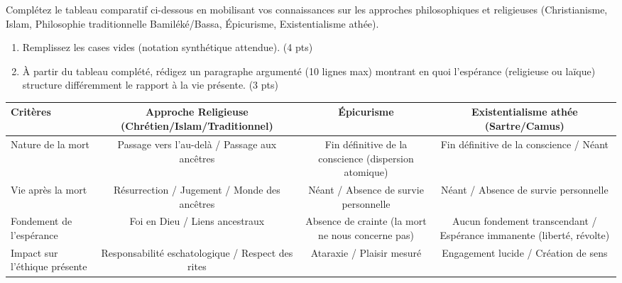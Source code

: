\documentclass[11pt]{article}
\begin{document}
\begin{exercice}
Complétez le tableau comparatif ci-dessous en mobilisant vos connaissances sur les approches philosophiques et religieuses (Christianisme, Islam, Philosophie traditionnelle Bamiléké/Bassa, Épicurisme, Existentialisme athée).
\begin{enumerate}
    \item Remplissez les cases vides (notation synthétique attendue). \hfill (4 pts)
    \item À partir du tableau complété, rédigez un paragraphe argumenté (10 lignes max) montrant en quoi \og l'espérance \fg{} (religieuse ou laïque) structure différemment le rapport à la vie présente. \hfill (3 pts)
\end{enumerate}

\begin{tabularx}{\linewidth}{|X|c|c|c|}
\hline
\textbf{Critères} & \textbf{Approche Religieuse (Chrétien/Islam/Traditionnel)} & \textbf{Épicurisme} & \textbf{Existentialisme athée (Sartre/Camus)} \\
\hline
Nature de la mort & Passage vers l'au-delà / Passage aux ancêtres & Fin définitive de la conscience (dispersion atomique) & Fin définitive de la conscience / Néant \\
\hline
Vie après la mort & Résurrection / Jugement / Monde des ancêtres & Néant / Absence de survie personnelle & Néant / Absence de survie personnelle \\
\hline
Fondement de l'espérance & Foi en Dieu / Liens ancestraux & Absence de crainte (la mort ne nous concerne pas) & Aucun fondement transcendant / Espérance immanente (liberté, révolte) \\
\hline
Impact sur l'éthique présente & Responsabilité eschatologique / Respect des rites & Ataraxie / Plaisir mesuré & Engagement lucide / Création de sens \\
\hline
\end{tabularx}
\end{exercice}
\end{document}
